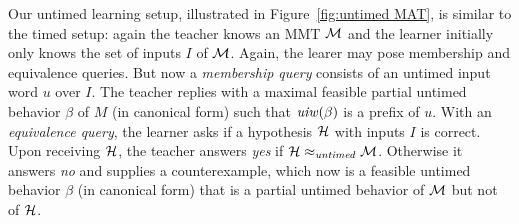 Our untimed learning setup, illustrated in Figure~\ref{fig:untimed MAT}, is similar to the timed setup:
again the teacher knows an MMT ${\mathcal M}$ and the learner initially only knows the set of inputs $I$ of ${\mathcal M}$.
Again, the learer may pose membership and equivalence queries.
But now a \emph{membership query} consists of an untimed input word $u$ over $I$.
The teacher replies with a maximal feasible partial untimed behavior $\beta$ of $M$ (in canonical form) such that
$\mathit{uiw}(\beta)$ is a prefix of $u$.
With an \emph{equivalence query}, the learner asks if a hypothesis ${\mathcal H}$ with inputs $I$ is correct.
Upon receiving ${\mathcal H}$, the teacher answers \emph{yes} if ${\mathcal H} \approx_{\mathit{untimed}} {\mathcal M}$.
Otherwise it answers \emph{no} and supplies a counterexample, which now is a feasible untimed behavior $\beta$ (in canonical form) that
is a partial untimed behavior of ${\mathcal M}$ but not of ${\mathcal H}$.

%

